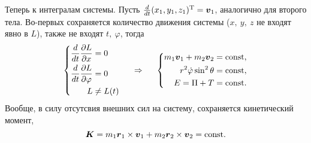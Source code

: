 Теперь к интегралам системы. Пусть $\frac{d }{d t} (x_1, y_1, z_1)^{\text{T}} = \mbox{\boldmath $v$}_1$, аналогично для второго тела. Во-первых сохраняется количество движения системы
($x, \ y, \ z$ не входят явно в $L$), также не входят $t, \ \varphi$, тогда
\begin{equation}
    \left\{\begin{aligned}
        \frac{d }{d t} \frac{\partial L}{\partial x} &= 0 \\
        \frac{d }{d t} \frac{\partial L}{\partial \varphi} &= 0 \\
        L &\neq L(t)
    \end{aligned}\right.    
    \hspace{0.5cm} \Rightarrow \hspace{0.5cm} 
    \left\{\begin{aligned}
        m_1 \mbox{\boldmath $v$}_1 + m_2 \mbox{\boldmath $v$}_2 &= \text{const}, \\
        r^2 \dot{\varphi} \sin^2 \theta  &= \text{const}, \\
        E = \Pi + T &= \text{const}.
    \end{aligned}\right.
\end{equation}
Вообще, в силу отсутсвия внешних сил на систему, сохраняется кинетический момент,
\begin{equation}
    \mbox{\boldmath $K$} = m_1 \mbox{\boldmath $r$}_1 \times \mbox{\boldmath $v$}_1 + 
    m_2 \mbox{\boldmath $r$}_2 \times \mbox{\boldmath $v$}_2 = \text{const}.
\end{equation}
